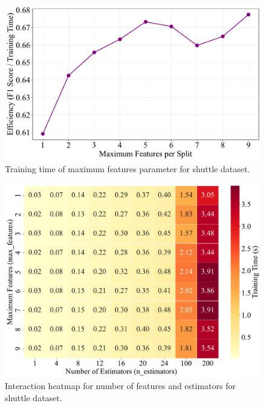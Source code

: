 \documentclass[10pt, conference]{IEEEtran}
\begin{document}
\begin{figure}[H]
	\centering
	\includegraphics[width=0.95\linewidth]{../results/shuttle/max_features/efficiency_vs_max_features.pdf}
	\caption{Training time of maximum features parameter for shuttle dataset.}
	\label{fig:max_features_tt_shuttle}
\end{figure}
\begin{figure}[H]
	\centering
	\includegraphics[width=0.95\linewidth]{../results/shuttle/max_features/interaction_time_heatmap.pdf}
	\caption{Interaction heatmap for number of features and estimators for shuttle dataset.}
	\label{fig:int_hm_tt_shuttle}
\end{figure}
\end{document}
